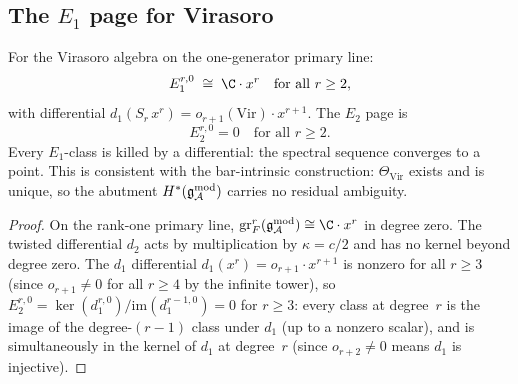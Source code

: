 
\subsection{The $E_1$ page for Virasoro}

\begin{proposition}
\ClaimStatusProvedHere
For the Virasoro algebra on the one-generator primary line:
\begin{equation}%
E_1^{r,0}
\;\cong\;
\C\cdot x^r
\quad\text{for all } r \geq 2,
\end{equation}
with differential $d_1(S_r\,x^r) = o_{r+1}(\mathrm{Vir})
\cdot x^{r+1}$. The $E_2$ page is
\begin{equation}%
E_2^{r,0} = 0
\quad\text{for all } r \geq 2.
\end{equation}
Every $E_1$-class is killed by a differential: the spectral
sequence converges to a point. This is consistent with the
bar-intrinsic construction: $\Theta_{\mathrm{Vir}}$ exists
and is unique, so the abutment $H^*(\mathfrak{g}_{\mathcal{A}}^{\mathrm{mod}})$ carries no
residual ambiguity.
\end{proposition}

\begin{proof}
On the rank-one primary line,
$\operatorname{gr}^r_F(\gAmod) \cong \C\cdot x^r$ in
degree zero. The twisted differential $d_2$ acts by
multiplication by $\kappa = c/2$ and has no kernel beyond
degree zero. The $d_1$ differential
$d_1(x^r) = o_{r+1}\cdot x^{r+1}$ is nonzero for all
$r \geq 3$ (since $o_{r+1} \neq 0$ for all $r \geq 4$
by the infinite tower), so
$E_2^{r,0} = \ker(d_1^{r,0})/\mathrm{im}(d_1^{r-1,0}) = 0$
for $r \geq 3$: every class at degree~$r$ is the image of
the degree-$(r{-}1)$ class under $d_1$ (up to a nonzero
scalar), and is simultaneously in the kernel of $d_1$ at
degree~$r$ (since $o_{r+2} \neq 0$ means $d_1$ is injective).
\end{proof}



